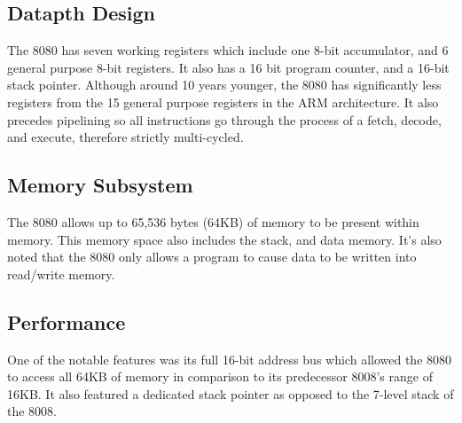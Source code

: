 \documentclass[draftclsnofoot, onecolumn, 10pt, compsoc]{IEEEtran}
\begin{document}
            
        \subsection{Datapth Design}
            The 8080 has seven working registers which include one 8-bit accumulator, and 6 general purpose 8-bit registers. It also has a 16 bit program counter, and a 16-bit stack pointer. Although around 10 years younger, the 8080 has significantly less registers from the 15 general purpose registers in the ARM architecture. It also precedes pipelining so all instructions go through the process of a fetch, decode, and execute, therefore strictly multi-cycled. 
                ~\cite{8080:Registers}
                ~\cite{8080:Datapath}
        \subsection{Memory Subsystem}
            The 8080 allows up to 65,536 bytes (64KB) of memory to be present within memory. This memory space also includes the stack, and data memory. It’s also noted that the 8080 only allows a program to cause data to be written into read/write memory. 
                ~\cite{8080:Instruction}
                ~\cite{8080:Datapath}
        \subsection{Performance}
            One of the notable features was its full 16-bit address bus which allowed the 8080 to access all 64KB of memory in comparison to its predecessor 8008’s range of 16KB. It also featured a dedicated stack pointer as opposed to the 7-level stack of the 8008. 
                ~\cite{8080:Instruction}
        

    \newpage           
    
    
    
\end{document}
